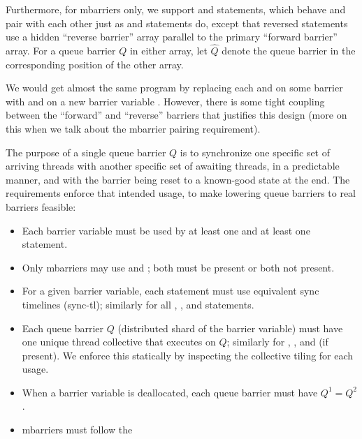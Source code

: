 \filbreak
Furthermore, for mbarriers only, we support  and  statements, which behave and pair with each other just as  and  statements do, except that reversed statements use a hidden ``reverse barrier'' array parallel to the primary ``forward barrier'' array.
For a queue barrier $Q$ in either array, let $\widehat{Q}$ denote the queue barrier in the corresponding position of the other array.

\filbreak
We would get almost the same program by replacing each  and  on some barrier  with  and  on a new barrier variable .
However, there is some tight coupling between the ``forward'' and ``reverse'' barriers that justifies this design (more on this when we talk about the mbarrier pairing requirement).

\filbreak
{}

The purpose of a single queue barrier $Q$ is to synchronize one specific set of arriving threads with another specific set of awaiting threads, in a predictable manner, and with the barrier being reset to a known-good state at the end.
The requirements enforce that intended usage, to make lowering queue barriers to real barriers feasible:

\filbreak
\begin{itemize}
  \item Each barrier variable must be used by at least one  and at least one  statement.
  \filbreak
  \item Only mbarriers may use  and ; both must be present or both not present.
  \filbreak
  \item For a given barrier variable, each  statement must use equivalent sync timelines (sync-tl); similarly for all , , and  statements.
  \filbreak
  \item Each queue barrier $Q$ (distributed shard of the barrier variable) must have one unique thread collective that executes  on $Q$; similarly for , , and  (if present). We enforce this statically by inspecting the collective tiling for each usage.
  \filbreak
  \item When a barrier variable is deallocated, each queue barrier must have $Q^1 = Q^2$.
  \filbreak
  \item mbarriers must follow the 
\end{itemize}

